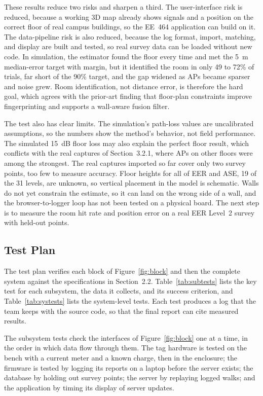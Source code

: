 \documentclass[12pt,letterpaper]{article}
\begin{document}
These results reduce two risks and sharpen a third. The user-interface risk is reduced, because a
working 3D map already shows signals and a position on the correct floor of real campus buildings, so
the EE~464 application can build on it. The data-pipeline risk is also reduced, because the log
format, import, matching, and display are built and tested, so real survey data can be loaded without
new code. In simulation, the estimator found the floor every time and met the 5~m median-error target
with margin, but it identified the room in only 49 to 72\% of trials, far short of the 90\% target,
and the gap widened as APs became sparser and noise grew. Room identification, not distance error, is
therefore the hard goal, which agrees with the prior-art finding that floor-plan constraints improve
fingerprinting \cite{evennou} and supports a wall-aware fusion filter.

The test also has clear limits. The simulation's path-loss values are uncalibrated assumptions, so
the numbers show the method's behavior, not field performance. The simulated 15~dB floor loss may also
explain the perfect floor result, which conflicts with the real captures of Section~3.2.1, where APs
on other floors were among the strongest. The real captures imported so far cover only two survey
points, too few to measure accuracy. Floor heights for all of EER and ASE, 19 of the 31 levels, are
unknown, so vertical placement in the model is schematic. Walls do not yet constrain the estimate, so
it can land on the wrong side of a wall, and the browser-to-logger loop has not been tested on a
physical board. The next step is to measure the room hit rate and position error on a real EER Level~2
survey with held-out points.

\subsection{Test Plan}\label{sec:testplan}
The test plan verifies each block of Figure~\ref{fig:block} and then the complete system against the
specifications in Section~2.2. Table~\ref{tab:subtests} lists the key test for each subsystem, the
data it collects, and its success criterion, and Table~\ref{tab:systests} lists the system-level
tests. Each test produces a log that the team keeps with the source code, so that the final report
can cite measured results.

The subsystem tests check the interfaces of Figure~\ref{fig:block} one at a time, in the order in
which data flow through them. The tag hardware is tested on the bench with a current meter and a
known charge, then in the enclosure; the firmware is tested by logging its reports on a laptop before
the server exists; the database by holding out survey points; the server by replaying logged walks;
and the application by timing its display of server updates.
\end{document}
